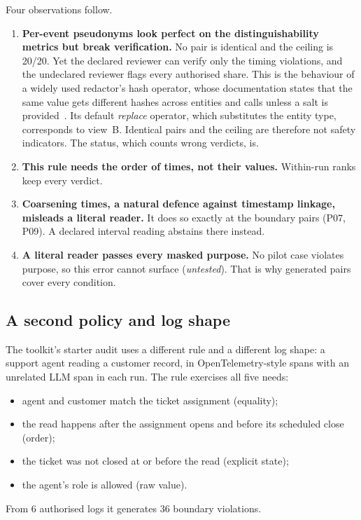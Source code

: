 \documentclass[11pt]{article}
\begin{document}
Four observations follow.
\begin{enumerate}
  \item \textbf{Per-event pseudonyms look perfect on the distinguishability metrics but break verification.} No pair is identical and the ceiling is 20/20. Yet the declared reviewer can verify only the timing violations, and the undeclared reviewer flags every authorised share. This is the behaviour of a widely used redactor's hash operator, whose documentation states that the same value gets different hashes across entities and calls unless a salt is provided~\cite{presidio}. Its default \emph{replace} operator, which substitutes the entity type, corresponds to view~B. Identical pairs and the ceiling are therefore not safety indicators. The status, which counts wrong verdicts, is.
  \item \textbf{This rule needs the order of times, not their values.} Within-run ranks keep every verdict.
  \item \textbf{Coarsening times, a natural defence against timestamp linkage, misleads a literal reader.} It does so exactly at the boundary pairs (P07, P09). A declared interval reading abstains there instead.
  \item \textbf{A literal reader passes every masked purpose.} No pilot case violates purpose, so this error cannot surface (\emph{untested}). That is why generated pairs cover every condition.
\end{enumerate}

\subsection*{A second policy and log shape}

The toolkit's starter audit uses a different rule and a different log shape: a support agent reading a customer record, in OpenTelemetry-style spans with an unrelated LLM span in each run. The rule exercises all five needs:
\begin{itemize}
  \item agent and customer match the ticket assignment (equality);
  \item the read happens after the assignment opens and before its scheduled close (order);
  \item the ticket was not closed at or before the read (explicit state);
  \item the agent's role is allowed (raw value).
\end{itemize}
From 6 authorised logs it generates 36 boundary violations.
\end{document}
